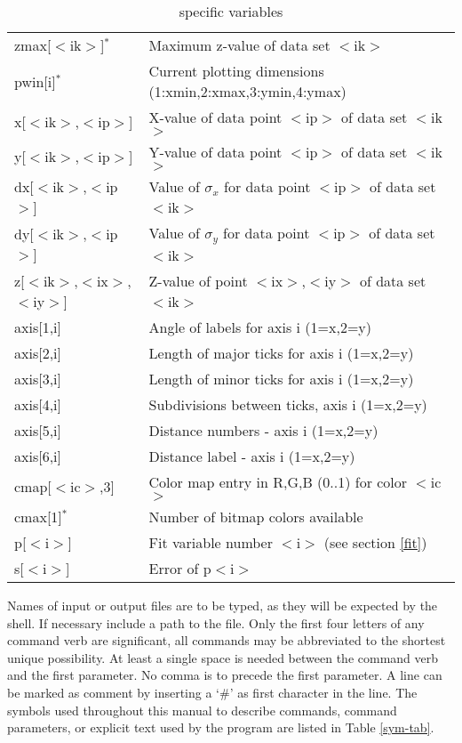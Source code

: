 \begin{table}[!tb]
\begin{tabularx}{\textwidth}{|p{40mm}|X|}
  zmax[$<$ik$>$]$^{*}$ & Maximum z-value of data set $<$ik$>$ \\
  pwin[i]$^{*}$        & Current plotting dimensions
                         (1:xmin,2:xmax,3:ymin,4:ymax) \\
  \hline
   x[$<$ik$>$,$<$ip$>$] & X-value of data point $<$ip$>$ of data set $<$ik$>$\\
   y[$<$ik$>$,$<$ip$>$] & Y-value of data point $<$ip$>$ of data set $<$ik$>$\\
  dx[$<$ik$>$,$<$ip$>$] & Value of $\sigma_{x}$ for data point $<$ip$>$ of
                          data set $<$ik$>$\\
  dy[$<$ik$>$,$<$ip$>$] & Value of $\sigma_{y}$ for data point $<$ip$>$ of
                          data set $<$ik$>$\\
   z[$<$ik$>$,$<$ix$>$,$<$iy$>$] &
                          Z-value of point $<$ix$>$,$<$iy$>$ of
                          data set $<$ik$>$\\
  \hline
  axis[1,i]       & Angle of labels for axis i (1=x,2=y) \\
  axis[2,i]       & Length of major ticks for axis i (1=x,2=y)\\
  axis[3,i]       & Length of minor ticks for axis i (1=x,2=y)\\
  axis[4,i]       & Subdivisions between ticks, axis i (1=x,2=y)\\
  axis[5,i]       & Distance numbers - axis i (1=x,2=y)\\
  axis[6,i]       & Distance label - axis i (1=x,2=y)\\
  \hline
  cmap[$<$ic$>$,3]    & Color map entry in R,G,B (0..1) for color $<$ic$>$ \\
  cmax[1]$^{*}$       & Number of bitmap colors available \\
  \hline
  p[$<$i$>$]          & Fit variable number $<$i$>$ (see section \ref{fit}) \\
  s[$<$i$>$]          & Error of p$<$i$>$ \\
  \hline
\end{tabularx}
\caption{\label{v1-tab}\Kuplot specific variables}
\end{table}

Names of input or output files are to be typed, as
they will be expected by the shell.  If necessary include a path to
the file.  Only the first four letters of any command verb are
significant, all commands may be abbreviated to the shortest unique
possibility.  At least a single space is needed between the command
verb and the first parameter.  No comma is to precede the first
parameter. A line can be marked as comment by inserting a `\#' as
first character in the line. The symbols used throughout this manual
to describe commands, command parameters, or explicit text used by
the program \Kuplot are listed in Table \ref{sym-tab}. \par

